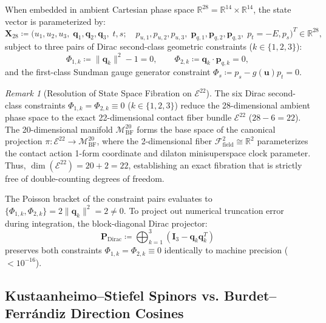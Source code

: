 \documentclass[11pt,a4paper,reqno]{article}
\theoremstyle{plain}
\theoremstyle{definition}
\theoremstyle{remark}
\newtheorem{remark}[theorem]{Remark}
\numberwithin{equation}{section}
\newcommand{\MbfTwenty}{\mathcal{M}_{\mathrm{BF}}^{20}}
\begin{document}
When embedded in ambient Cartesian phase space $\mathbb{R}^{28} = \mathbb{R}^{14} \times \mathbb{R}^{14}$, the state vector is parameterized by:
\begin{equation}
  \bm{X}_{28} \coloneqq \Big( u_1, u_2, u_3, \; \bm{q}_1, \bm{q}_2, \bm{q}_3, \; t, s; \quad p_{u,1}, p_{u,2}, p_{u,3}, \; \bm{p}_{q,1}, \bm{p}_{q,2}, \bm{p}_{q,3}, \; p_t = -E, p_s \Big)^T \in \mathbb{R}^{28},
  \label{eq:state_vector_20}
\end{equation}
subject to three pairs of Dirac second-class geometric constraints ($k \in \{1, 2, 3\}$):
\begin{equation}
  \Phi_{1,k} \coloneqq \|\bm{q}_k\|^2 - 1 = 0, \qquad \Phi_{2,k} \coloneqq \bm{q}_k \cdot \bm{p}_{q,k} = 0,
  \label{eq:dirac_constraints_4body}
\end{equation}
and the first-class Sundman gauge generator constraint $\Phi_s \coloneqq p_s - g(\bm{u}) p_t = 0$. 

\begin{remark}[Resolution of State Space Fibration on $\mathcal{E}^{22}$]
The six Dirac second-class constraints $\Phi_{1,k} = \Phi_{2,k} \equiv 0$ ($k \in \{1,2,3\}$) reduce the 28-dimensional ambient phase space to the exact 22-dimensional contact fiber bundle $\mathcal{E}^{22}$ ($28 - 6 = 22$). The 20-dimensional manifold $\MbfTwenty$ forms the base space of the canonical projection $\pi: \mathcal{E}^{22} \to \MbfTwenty$, where the 2-dimensional fiber $\mathcal{F}_{\mathrm{field}}^2 \cong \mathbb{R}^2$ parameterizes the contact action 1-form coordinate and dilaton minisuperspace clock parameter. Thus, $\dim(\mathcal{E}^{22}) = 20 + 2 = 22$, establishing an exact fibration that is strictly free of double-counting degrees of freedom.
\end{remark}

The Poisson bracket of the constraint pairs evaluates to $\{\Phi_{1,k}, \Phi_{2,k}\} = 2 \|\bm{q}_k\|^2 = 2 \ne 0$.
To project out numerical truncation error during integration, the block-diagonal Dirac projector:
\begin{equation}
  \mathbf{P}_{\mathrm{Dirac}} \coloneqq \bigoplus_{k=1}^3 \left( \mathbf{I}_3 - \bm{q}_k \bm{q}_k^T \right)
  \label{eq:dirac_projector_mbf20}
\end{equation}
preserves both constraints $\Phi_{1,k} = \Phi_{2,k} \equiv 0$ identically to machine precision ($< 10^{-16}$).

\subsection{Kustaanheimo--Stiefel Spinors vs. Burdet--Ferr\'andiz Direction Cosines}
\label{subsec:ks_vs_bf_comparison}
\end{document}
